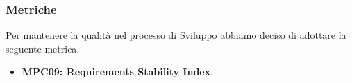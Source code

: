 \subsubsection{Metriche}
Per mantenere la qualità nel processo di Sviluppo abbiamo deciso di adottare la seguente metrica.
\begin{itemize}
    \item \textbf{MPC09: Requirements Stability Index}.
\end{itemize}
